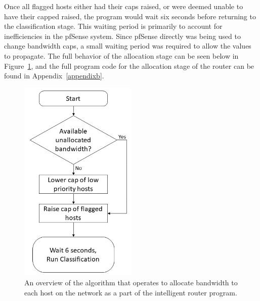 Once all flagged hosts either had their caps raised, or were deemed unable to have their capped raised, the program would wait six seconds before returning to the classification stage.
This waiting period is primarily to account for inefficiencies in the pfSense system.
Since pfSense directly was being used to change bandwidth caps, a small waiting period was required to allow the values to propagate.
The full behavior of the allocation stage can be seen below in Figure~\ref{allocation}, and the full program code for the allocation stage of the router can be found in Appendix~\ref{appendixb}.
\begin{figure}[!ht]
    \centering
    \includegraphics[width=0.5\textwidth,keepaspectratio]{Images/Chpt4/Flowchart_Allocation_Updated.png}
    \caption{An overview of the algorithm that operates to allocate bandwidth to each host on the network as a part of the intelligent router program.}
    \label{allocation}
\end{figure}

